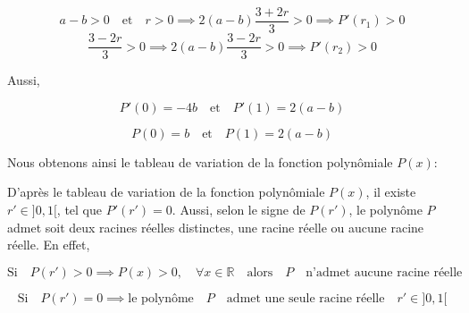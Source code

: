 \documentclass[12pt,a4paper,article]{memoir}
\begin{document}
\[a-b > 0 \quad \textrm{et} \quad r>0 \implies 2(a-b)\frac{3 + 2r}{3} > 0 \implies P'(r_{1}) > 0\]
\[\frac{3 - 2r}{3} > 0 \implies 2(a-b)\frac{3 - 2r}{3} > 0 \implies P'(r_{2}) > 0\]

Aussi,

\begin{equation}
P'(0) = -4b \quad \textrm{et} \quad P'(1) = 2(a-b)
\label{equation-pb-5-pderpremval}
\end{equation}

\begin{equation}
P(0) = b \quad \textrm{et} \quad P(1) = 2(a-b)
\label{equation-pb-5-pval}
\end{equation}

Nous obtenons ainsi le tableau de variation de la fonction polynômiale $P(x)$:

\bigskip

\begin{center}
\end{center}

\bigskip

D'après le tableau de variation de la fonction polynômiale $P(x)$, il existe $r' \in ]0,1[$, tel que $P'(r') = 0$.
Aussi, selon le signe de $P(r')$, le polynôme $P$ admet soit deux racines réelles distinctes, une racine réelle ou aucune racine réelle. En effet, 

\begin{equation}
\textrm{Si} \quad P(r') > 0 \implies P(x) > 0, \quad \forall x \in \mathbb{R} \quad \textrm{alors} \quad P \quad \textrm{n'admet aucune racine réelle}
\label{equation-sig-pder-rppos}
\end{equation}

\begin{equation}
\textrm{Si} \quad P(r') = 0 \implies \textrm{le polynôme} \quad P \quad \textrm{admet une seule racine réelle} \quad r' \in ]0,1[
\label{equation-sig-pder-rpnul}
\end{equation}
\end{document}
